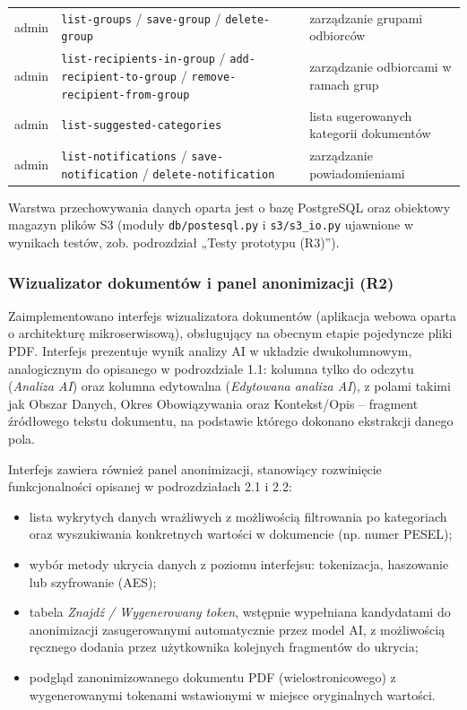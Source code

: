 \begin{longtable}{p{} p{} p{}}
admin & \texttt{list-groups} / \texttt{save-\allowbreak group} / \texttt{delete-group} & zarządzanie grupami odbiorców \\
admin & \texttt{list-recipients-\allowbreak in-group} / \texttt{add-\allowbreak recipient-to-group} / \texttt{remove-\allowbreak recipient-from-group} & zarządzanie odbiorcami w ramach grup \\
admin & \texttt{list-suggested-\allowbreak categories} & lista sugerowanych kategorii dokumentów \\
admin & \texttt{list-notifications} / \texttt{save-\allowbreak notification} / \texttt{delete-\allowbreak notification} & zarządzanie powiadomieniami \\
\bottomrule
\end{longtable}
\endgroup

Warstwa przechowywania danych oparta jest o bazę PostgreSQL oraz obiektowy magazyn plików S3 (moduły \texttt{db/postesql.py} i \texttt{s3/s3\_io.py} ujawnione w wynikach testów, zob. podrozdział „Testy prototypu (R3)”).

\subsubsection*{Wizualizator dokumentów i panel anonimizacji (R2)}

Zaimplementowano interfejs wizualizatora dokumentów (aplikacja webowa oparta o architekturę mikroserwisową), obsługujący na obecnym etapie pojedyncze pliki PDF. Interfejs prezentuje wynik analizy AI w układzie dwukolumnowym, analogicznym do opisanego w podrozdziale 1.1: kolumna tylko do odczytu (\emph{Analiza AI}) oraz kolumna edytowalna (\emph{Edytowana analiza AI}), z polami takimi jak Obszar Danych, Okres Obowiązywania oraz Kontekst/Opis -- fragment źródłowego tekstu dokumentu, na podstawie którego dokonano ekstrakcji danego pola.

Interfejs zawiera również panel anonimizacji, stanowiący rozwinięcie funkcjonalności opisanej w podrozdziałach 2.1 i 2.2:
\begin{itemize}
    \item lista wykrytych danych wrażliwych z możliwością filtrowania po kategoriach oraz wyszukiwania konkretnych wartości w dokumencie (np. numer PESEL);
    \item wybór metody ukrycia danych z poziomu interfejsu: tokenizacja, haszowanie lub szyfrowanie (AES);
    \item tabela \emph{Znajdź / Wygenerowany token}, wstępnie wypełniana kandydatami do anonimizacji zasugerowanymi automatycznie przez model AI, z możliwością ręcznego dodania przez użytkownika kolejnych fragmentów do ukrycia;
    \item podgląd zanonimizowanego dokumentu PDF (wielostronicowego) z wygenerowanymi tokenami wstawionymi w miejsce oryginalnych wartości.
\end{itemize}

